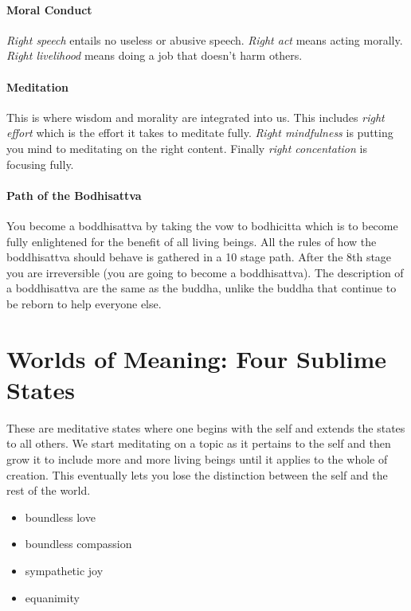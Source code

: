 \documentclass{article}
\begin{document}
\paragraph{Moral Conduct}
\label{par:moral_conduct}
\emph{Right speech} entails no useless or abusive speech. \emph{Right act} means acting morally. \emph{Right livelihood} means doing a job that doesn't harm others.

\paragraph{Meditation}
\label{par:meditation}
This is where wisdom and morality are integrated into us. This includes \emph{right effort} which is the effort it takes to meditate fully. \emph{Right mindfulness} is putting you mind to meditating on the right content. Finally \emph{right concentation} is focusing fully.

\paragraph{Path of the Bodhisattva}
\label{par:path_of_the_bodhisattva}
You become a boddhisattva by taking the vow to bodhicitta which is to become fully enlightened for the benefit of all living beings. All the rules of how the boddhisattva should behave is gathered in a 10 stage path. After the 8th stage you are irreversible (you are going to become a boddhisattva). The description of a boddhisattva are the same as the buddha, unlike the buddha that continue to be reborn to help everyone else.

\section*{Worlds of Meaning: Four Sublime States}
\label{sec:worlds_of_meaning_four_sublime_states}
These are meditative states where one begins with the self and extends the states to all others. We start meditating on a topic as it pertains to the self and then grow it to include more and more living beings until it applies to the whole of creation. This eventually lets you lose the distinction between the self and the rest of the world.
\begin{itemize}
	\item boundless love
	\item boundless compassion
	\item sympathetic joy
	\item equanimity
\end{itemize}
\end{document}
